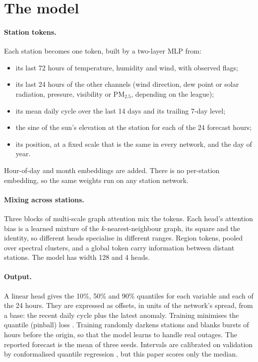 \section{The \pwm model}\label{sec:model}

\paragraph{Station tokens.}
Each station becomes one token, built by a two-layer MLP from:
\begin{itemize}
\item its last 72 hours of temperature, humidity and wind, with observed flags;
\item its last 24 hours of the other channels (wind direction, dew point or solar radiation, pressure, visibility or
PM$_{2.5}$, depending on the league);
\item its mean daily cycle over the last 14 days and its trailing 7-day level;
\item the sine of the sun's elevation at the station for each of the 24 forecast hours;
\item its position, at a fixed scale that is the same in every network, and the day of year.
\end{itemize}
Hour-of-day and month embeddings are added. There is no per-station embedding, so the same weights run on any
station network.

\paragraph{Mixing across stations.}
Three blocks of multi-scale graph attention mix the tokens. Each head's attention bias is a learned mixture of the
$k$-nearest-neighbour graph, its square and the identity, so different heads specialise in different ranges. Region
tokens, pooled over spectral clusters, and a global token carry information between distant stations. The model has
width 128 and 4 heads.

\paragraph{Output.}
A linear head gives the 10\%, 50\% and 90\% quantiles for each variable and each of the 24 hours. They are
expressed as offsets, in units of the network's spread, from a base: the recent daily cycle plus the latest anomaly.
Training minimises the quantile (pinball) loss \citep{koenker1978quantiles}. Training randomly darkens stations and
blanks bursts of hours before the origin, so that the model learns to handle real outages. The reported forecast is
the mean of three seeds. Intervals are calibrated on validation by conformalised quantile regression
\citep{romano2019cqr}, but this paper scores only the median.

